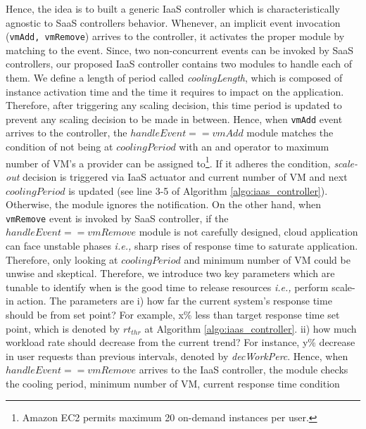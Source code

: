 Hence, the idea is to built a generic IaaS controller which is characteristically agnostic to SaaS controllers behavior. Whenever, an implicit event invocation (\texttt{vmAdd, vmRemove}) arrives to the controller, it activates the proper module by matching to the event. Since, two non-concurrent events can be invoked by SaaS controllers, our proposed IaaS controller contains two modules to handle each of them. We define a length of period called \emph{coolingLength}, which is composed of instance activation time and the time it requires to impact on the application. Therefore, after triggering any scaling decision, this time period is updated to prevent any scaling decision to be made in between. Hence, when \texttt{vmAdd} event arrives to the controller, the $handleEvent == vmAdd$ module matches the condition of not being at $coolingPeriod$ with an and operator 
to maximum number of VM's a provider can be assigned to\footnote{Amazon EC2 permits maximum 20 on-demand instances per user.}. If it adheres the condition, \emph{scale-out} decision is triggered via IaaS actuator and current number of VM and next $coolingPeriod$ is updated (see line 3-5 of Algorithm \ref{algo:iaas_controller}). Otherwise, the module ignores the notification. On the other hand, when \texttt{vmRemove} event is invoked by SaaS controller, if the $handleEvent == vmRemove$ module is not carefully designed, cloud application can face unstable phases \emph{i.e.,} sharp rises of response time to saturate application. Therefore, only looking at $coolingPeriod$ and minimum number of VM
 could be unwise and skeptical. Therefore, we introduce two key parameters which are tunable to identify when is the good time to release resources \emph{i.e.,} perform scale-in action. The parameters are i) how far the current system's response time should be from set point? For example, x\% less than target response time set point, which is denoted by $rt_{thr}$ at Algorithm \ref{algo:iaas_controller}. ii) how much workload rate should decrease from the current trend? For instance, y\% decrease in user requests than previous intervals, denoted by \emph{decWorkPerc}. Hence, when $handleEvent == vmRemove$ arrives to the IaaS controller, the module checks the cooling period, minimum number of VM, current response time condition
